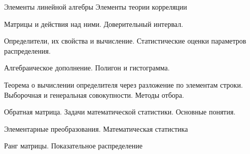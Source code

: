 \documentclass[
	14pt,
	a4paper,
	]
	{scrartcl}
\begin{document}
\shapk
{}
\setcounter{zad}{0}

\vfill
\z 	Элементы линейной алгебры
 \vfill
\z 	Элементы теории корреляции \vfill

\vfill

\newpage


\shapk
{}
\setcounter{zad}{0}

\vfill
\z 	Матрицы и действия над ними.
 \vfill
\z 	Доверительный интервал.
 \vfill

\vfill

\newpage


\shapk
{}
\setcounter{zad}{0}

\vfill
\z 	Определители, их свойства и вычисление.
 \vfill
\z 	Статистические оценки параметров распределения.
 \vfill

\vfill

\newpage


\shapk
{}
\setcounter{zad}{0}

\vfill
\z 	Алгебраическое дополнение.
 \vfill
\z 	Полигон и гистограмма.
 \vfill

\vfill

\newpage


\shapk
{}
\setcounter{zad}{0}

\vfill
\z 	Теорема о вычислении определителя через разложение по элементам строки.
 \vfill
\z 	Выборочная и генеральная совокупности. Методы отбора. 
 \vfill

\vfill

\newpage


\shapk
{}
\setcounter{zad}{0}

\vfill
\z 	Обратная матрица.
 \vfill
\z 	Задачи математической статистики. Основные понятия.
 \vfill

\vfill

\newpage


\shapk
{}
\setcounter{zad}{0}

\vfill
\z 	Элементарные преобразования.
 \vfill
\z 	Математическая статистика
 \vfill

\vfill

\newpage


\shapk
{}
\setcounter{zad}{0}

\vfill
\z 	Ранг матрицы.
 \vfill
\z 	Показательное распределение
 \vfill

\vfill
\end{document}
